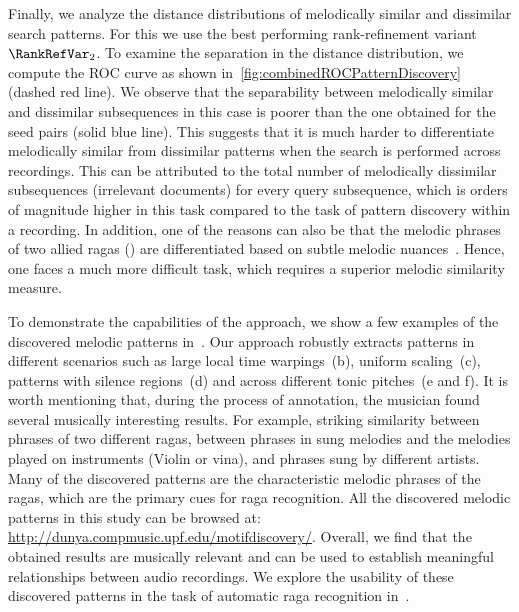 Finally, we analyze the distance distributions of melodically similar and dissimilar search patterns. For this we use the best performing rank-refinement variant $\RankRefVar_2$. To examine the separation in the distance distribution, we compute the ROC curve as shown in~\ref{fig:combinedROCPatternDiscovery} (dashed red line). We observe that the separability between melodically similar and dissimilar subsequences in this case is poorer than the one obtained for the seed pairs (solid blue line). This suggests that it is much harder to differentiate melodically similar from dissimilar patterns when the search is performed across recordings. This can be attributed to the total number of melodically dissimilar subsequences (irrelevant documents) for every query subsequence, which is orders of magnitude higher in this task compared to the task of pattern discovery within a recording. In addition, one of the reasons can also be that the melodic phrases of two allied \glspl{raga} () are differentiated based on subtle melodic nuances~\citep{Viswanathan2004}. Hence, one faces a much more difficult task, which requires a superior melodic similarity measure.%

To demonstrate the capabilities of the approach, we show a few examples of the discovered melodic patterns in~. Our approach robustly extracts patterns in different scenarios such as large local time warpings~(b), uniform scaling~(c), patterns with silence regions~(d) and across different tonic pitches~(e and f). It is worth mentioning that, during the process of annotation, the musician found several musically interesting results. For example, striking similarity between phrases of two different \glspl{raga}, between phrases in sung melodies and the melodies played on instruments (Violin or \Gls{vina}), and phrases sung by different artists. Many of the discovered patterns are the characteristic melodic phrases of the \glspl{raga}, which are the primary cues for \gls{raga} recognition. All the discovered melodic patterns in this study can be browsed at: \url{http://dunya.compmusic.upf.edu/motifdiscovery/}.  Overall, we find that the obtained results are musically relevant and can be used to establish meaningful relationships between audio recordings. We explore the usability of these discovered patterns in the task of automatic \gls{raga} recognition in~.



